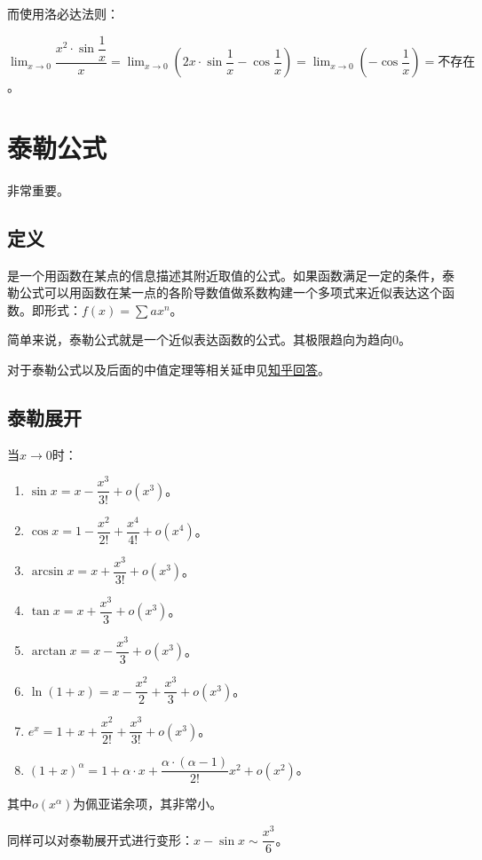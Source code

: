 \documentclass[UTF8]{ctexart}
\begin{document}
而使用洛必达法则：

$\lim_{x\to 0}\dfrac{x^2\cdot\sin\dfrac{1}{x}}{x}=\lim_{x\to 0}\left(2x\cdot\sin\dfrac{1}{x}-\cos\dfrac{1}{x}\right)=\lim_{x\to 0}\left(-\cos\dfrac{1}{x}\right)=\text{不存在}$。

\section{泰勒公式}

非常重要。

\subsection{定义}

是一个用函数在某点的信息描述其附近取值的公式。如果函数满足一定的条件，泰勒公式可以用函数在某一点的各阶导数值做系数构建一个多项式来近似表达这个函数。即形式：$f(x)=\sum ax^n$。

简单来说，泰勒公式就是一个近似表达函数的公式。其极限趋向为趋向0。

对于泰勒公式以及后面的中值定理等相关延申见\href{https://www.zhihu.com/question/25627482}{知乎回答}。

\subsection{泰勒展开}

当$x\to 0$时：

\begin{enumerate}
    \item $\sin x=x-\dfrac{x^3}{3!}+o(x^3)$。
    \item $\cos x=1-\dfrac{x^2}{2!}+\dfrac{x^4}{4!}+o(x^4)$。
    \item $\arcsin x=x+\dfrac{x^3}{3!}+o(x^3)$。
    \item $\tan x=x+\dfrac{x^3}{3}+o(x^3)$。
    \item $\arctan x=x-\dfrac{x^3}{3}+o(x^3)$。
    \item $\ln(1+x)=x-\dfrac{x^2}{2}+\dfrac{x^3}{3}+o(x^3)$。
    \item $e^x=1+x+\dfrac{x^2}{2!}+\dfrac{x^3}{3!}+o(x^3)$。
    \item $(1+x)^\alpha=1+\alpha\cdot x+\dfrac{\alpha\cdot(\alpha-1)}{2!}x^2+o(x^2)$。
\end{enumerate}

其中$o(x^\alpha)$为佩亚诺余项，其非常小。

同样可以对泰勒展开式进行变形：$x-\sin x\sim\dfrac{x^3}{6}$。
\end{document}
